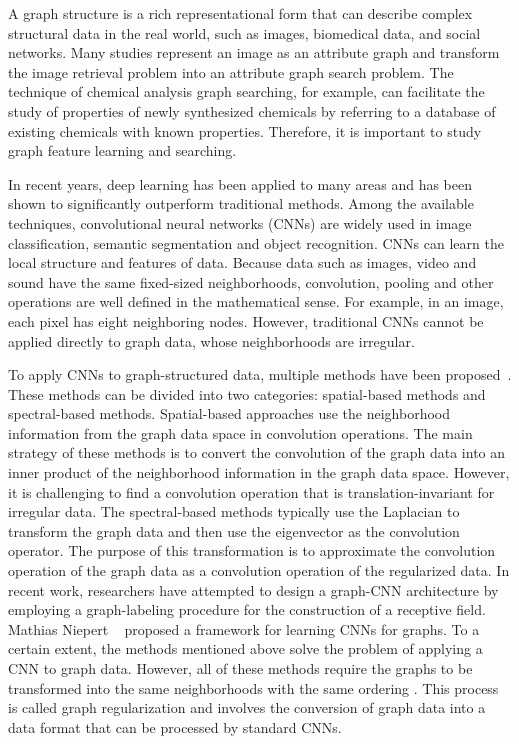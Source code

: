\documentclass[11pt]{article}
\begin{document}
A graph structure is a rich representational form that can describe complex structural data in the real world, such as images, biomedical data, and social networks. Many studies represent an image as an attribute graph and transform the image retrieval problem into an attribute graph search problem. The technique of chemical analysis graph searching, for example, can facilitate the study of properties of newly synthesized chemicals by referring to a database of existing chemicals with known properties. Therefore, it is important to study graph feature learning and searching.

In recent years, deep learning has been applied to many areas and has been shown to significantly outperform traditional methods. Among the available techniques, convolutional neural networks (CNNs) are widely used in image classification, semantic segmentation and object recognition. CNNs can learn the local structure and features of data. Because data such as images, video and sound have the same fixed-sized neighborhoods, convolution, pooling and other operations are well defined in the mathematical sense. For example, in an image, each pixel has eight neighboring nodes. However, traditional CNNs cannot be applied directly to graph data,  whose neighborhoods are irregular.

To apply CNNs to graph-structured data, multiple methods have been proposed~\cite{Bruna2013Spectral_5,Defferrard2016Convolutional_12,Komorowski2012Fluctuations_15,Lin2011Regularized,Simonyan2014Very,RenHG015,Verma2017Dynamic}. These methods can be divided into two categories: spatial-based methods and spectral-based methods. Spatial-based approaches use the neighborhood information from the graph data  space in convolution operations. The main strategy of these methods is to convert the convolution of the graph data into an inner product of the neighborhood information in the graph data space. However, it is challenging to find a convolution operation that is translation-invariant for irregular data. The spectral-based methods typically use the Laplacian to transform the graph data and then use the eigenvector as the convolution operator. The purpose of this transformation is to approximate the convolution operation of the graph data as a convolution operation of the regularized data. In recent work, researchers have attempted to design a graph-CNN architecture by employing a graph-labeling procedure for the construction of a receptive field. Mathias Niepert ~\cite{Niepert2016Learning_10} proposed a framework for learning CNNs for graphs. To a certain extent, the methods mentioned above solve the problem of applying a CNN to graph data. However, all of these methods require the graphs to be transformed into the same neighborhoods with the same ordering . This process is called graph regularization and involves the conversion of graph data into a data format that can be processed by standard CNNs.
\end{document}
